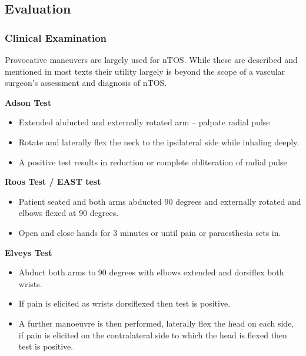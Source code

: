 \documentclass[
]{book}
\begin{document}
\hypertarget{evaluation-9}{%
\subsection{Evaluation}\label{evaluation-9}}

\hypertarget{clinical-examination}{%
\subsubsection{Clinical Examination}\label{clinical-examination}}

Provocative maneuvers are largely used for nTOS. While these are
described and mentioned in most texts their utility largely is beyond
the scope of a vascular surgeon's assessment and diagnosis of nTOS.

\textbf{Adson Test}

\begin{itemize}
\item
  Extended abducted and externally rotated arm -- palpate radial pulse
\item
  Rotate and laterally flex the neck to the ipsilateral side while
  inhaling deeply.
\item
  A positive test results in reduction or complete obliteration of
  radial pulse
\end{itemize}

\textbf{Roos Test / EAST test}

\begin{itemize}
\item
  Patient seated and both arms abducted 90 degrees and externally
  rotated and elbows flexed at 90 degrees.
\item
  Open and close hands for 3 minutes or until pain or paraesthesia
  sets in.
\end{itemize}

\textbf{Elveys Test}

\begin{itemize}
\item
  Abduct both arms to 90 degrees with elbows extended and dorsiflex
  both wrists.
\item
  If pain is elicited as wrists dorsiflexed then test is positive.
\item
  A further manoeuvre is then performed, laterally flex the head on
  each side, if pain is elicited on the contralateral side to which
  the head is flexed then test is positive.
  \citep{humphries124ThoracicOutlet2019}
\end{itemize}
\end{document}
